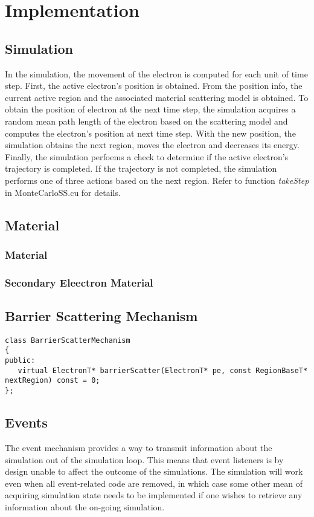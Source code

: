 \chapter{Implementation}
\section{Simulation}
In the simulation, the movement of the electron is computed for each unit of time step. First, the active electron's position is obtained. From the position info, the current active region and the associated material scattering model is obtained. To obtain the position of electron at the next time step, the simulation acquires a random mean path length of the electron based on the scattering model and computes the electron's position at next time step. With the new position, the simulation obtains the next region, moves the electron and decreases its energy. Finally, the simulation perfoems a check to determine if the active electron's trajectory is completed. If the trajectory is not completed, the simulation performs one of three actions based on the next region. Refer to function \emph{takeStep} in MonteCarloSS.cu for details.

\section{Material}\label{sec:impl_mat}
\subsection{Material}
\subsection{Secondary Eleectron Material}

\section{Barrier Scattering Mechanism}\label{sec:impl_barrierSM}
\begin{lstlisting}
class BarrierScatterMechanism
{
public:
   virtual ElectronT* barrierScatter(ElectronT* pe, const RegionBaseT* nextRegion) const = 0;
};
\end{lstlisting}

\section{Events}\label{sec:events}
The event mechanism provides a way to transmit information about the simulation out of the simulation loop. This means that event listeners is by design unable to affect the outcome of the simulations. The simulation will work even when all event-related code are removed, in which case some other mean of acquiring simulation state needs to be implemented if one wishes to retrieve any information about the on-going simulation.

